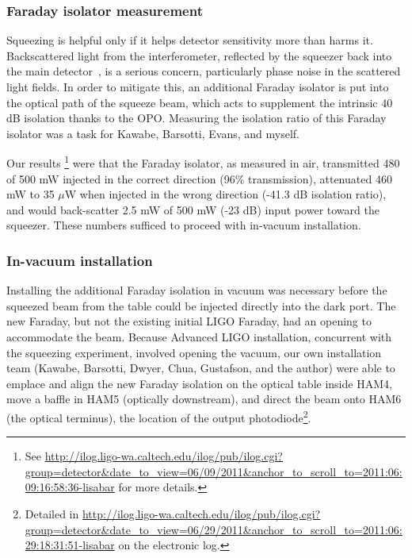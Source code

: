             \subsubsection{Faraday isolator measurement}
            \label{Faraday}



Squeezing is helpful only if it helps detector sensitivity more than harms it.
Backscattered light from the interferometer, reflected by the squeezer back into the main detector~\cite{ChuaThesis,BarsottiNatureSqueezing}, is a serious concern, particularly phase noise in the scattered light fields.
In order to mitigate this, an additional Faraday isolator is put into the optical path of the squeeze beam, which acts to supplement the intrinsic 40 dB isolation thanks to the OPO.
Measuring the isolation ratio of this Faraday isolator was a task for Kawabe, Barsotti, Evans, and myself.

Our results \footnote{See \url{http://ilog.ligo-wa.caltech.edu/ilog/pub/ilog.cgi?group=detector&date_to_view=06/09/2011&anchor_to_scroll_to=2011:06:09:16:58:36-lisabar} for more details.} were that the Faraday isolator, as measured in air, transmitted 480 of 500 mW injected in the correct direction (96\% transmission), attenuated 460 mW to 35 $\mu$W when injected in the wrong direction (-41.3 dB isolation ratio), and would back-scatter 2.5 mW of 500 mW (-23 dB) input power toward the squeezer. 
These numbers sufficed to proceed with in-vacuum installation.

            \subsubsection{In-vacuum installation}
            \label{In-vacuum}

Installing the additional Faraday isolation in vacuum was necessary before the squeezed beam from the table could be injected directly into the dark port.
The new Faraday, but not the existing initial LIGO Faraday, had an opening to accommodate the beam. 
Because Advanced LIGO installation, concurrent with the squeezing experiment, involved opening the vacuum, our own installation team (Kawabe, Barsotti, Dwyer, Chua, Gustafson, and the author) were able to emplace and align the new Faraday isolation on the optical table inside HAM4, move a baffle in HAM5 (optically downstream), and direct the beam onto HAM6 (the optical terminus), the location of the output photodiode\footnote{Detailed in \url{http://ilog.ligo-wa.caltech.edu/ilog/pub/ilog.cgi?group=detector&date_to_view=06/29/2011&anchor_to_scroll_to=2011:06:29:18:31:51-lisabar} on the electronic log.}.

